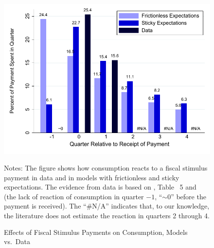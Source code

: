\documentclass[titlepage]{./econtex}
\begin{document}
\begin{figure}
  \centering
\caption{Effects of Fiscal Stimulus Payments on Consumption, Models vs.\ Data}
\label{parker}
{ \includegraphics[width=1.0\textwidth]{./Figures/parkerExperiment}}

\begin{flushleft}
  \footnotesize Notes: The figure shows how consumption reacts to a fiscal stimulus payment in data and in models with frictionless and sticky expectations. The evidence from data is based on \cite{psjmMPC2008}, Table ~5 and \cite{brodaParker} (the lack of reaction of consumption in quarter $-1$, ``$\sim0$'' before the payment is received). The ``\#N/A'' indicates that, to our knowledge, the literature does not estimate the reaction in quarters 2 through 4.
  \normalsize
  \end{flushleft}
\end{figure}
\end{document}
